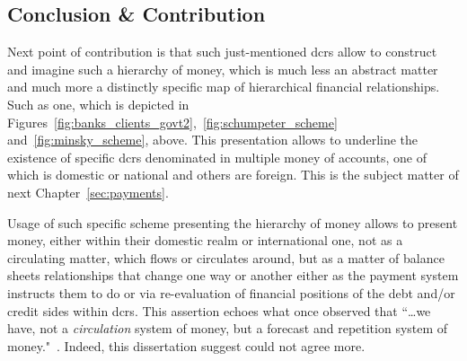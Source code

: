 \subsection{Conclusion \& Contribution}

Next point of contribution is that such just-mentioned \acp{dcr} allow to construct and imagine such a hierarchy of money, which is much less an abstract matter and much more a distinctly specific map of hierarchical financial relationships. Such as one, which is depicted in Figures~\ref{fig:banks_clients_govt2},~\ref{fig:schumpeter_scheme} and~\ref{fig:minsky_scheme}, above. This presentation allows to underline the existence of specific \acp{dcr} denominated in multiple money of accounts, one of which is domestic or national and others are foreign. This is the subject matter of next Chapter~\ref{sec:payments}.

Usage of such specific scheme presenting the hierarchy of money allows to present money, either within their domestic realm or international one, not as a circulating matter, which flows or circulates around, but as a matter of balance sheets relationships that change one way or another either as the payment system instructs them to do or via re-evaluation of financial positions of the debt and/or credit sides within \acp{dcr}. This assertion echoes what \citeauthor{commons1951} once observed that ``\dots we have, not a \textit{circulation} system of money, but a forecast and repetition system of money."~\citep[as quoted in][p.~11161, emphasis original]{whalen1993}. Indeed, this dissertation suggest \citeauthor{innes1913} could not agree more.